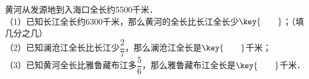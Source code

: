 黄河从发源地到入海口全长约5500千米．\\
（1）已知长江全长约6300千米，那么黄河的全长比长江全长少$\key{\qquad}$；（填几分之几）\\
（2）已知澜沧江全长比长江少$\dfrac{2}{7}$，那么澜沧江全长是$\key{\qquad}$千米；
\\
（3）已知黄河全长比雅鲁藏布江多$\dfrac{5}{6}$，那么雅鲁藏布江全长是$\key{\qquad}$千米．